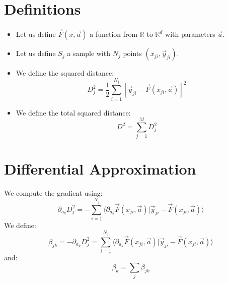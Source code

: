 \documentclass[aps,12pt]{revtex4}
\begin{document}
\section{Definitions}

\begin{itemize}

\item Let us define $\vec F(x,\vec a)$ a function from $\mathbb R$ to $\mathbb R^d$ with parameters $\vec a$.
\item Let us define $S_j$ a sample with $N_j$ points $(x_{ji},\vec y_{ji})$.
\item We define the squared distance:
\begin{equation}
	D^2_j = \frac{1}{2}\sum_{i=1}^{N_j} \left[\vec y_{ji} - \vec F(x_{ji},\vec a) \right]^2
\end{equation}

\item We define the total squared distance:
\begin{equation}
	 D^2 = \sum_{j=1}^M D^2_j
\end{equation}

\end{itemize}

 	


\section{Differential Approximation}


We compute the gradient using:
\begin{equation}
	\partial_{a_k} D^2_j = - \sum_{i=1}^{N_j} \langle  \partial_{a_k} \vec F(x_{ji},\vec a) \vert \vec y_{ji} - \vec F(x_{ji},\vec a) \rangle
\end{equation}
We define:
\begin{equation}
	\beta_{jk} = -\partial_{a_k} D^2_j = \sum_{i=1}^{N_j} \langle  \partial_{a_k} \vec F(x_{ji},\vec a) \vert \vec y_{ji} - \vec F(x_{ji},\vec a) \rangle
\end{equation}
and:
\begin{equation}
	\beta_k = \sum_j \beta_{jk}
\end{equation}
\end{document}
